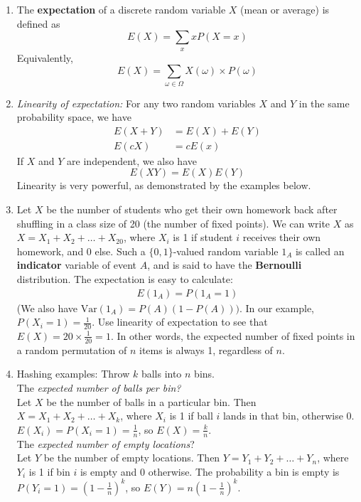 \documentclass[10pt]{article}
\begin{document}
\begin{multicols}{2}
\begin{enumerate}
\begin{enumerate}
            \item The \textbf{expectation} of a discrete random variable $X$ (mean or average) is defined as 
            $$E(X) = \sum_{x} x P(X=x)$$
            Equivalently, 
            $$E(X) = \sum_{\omega \in \Omega} X(\omega) \times P(\omega)$$
            \item \textit{Linearity of expectation:} For any two random variables $X$ and $Y$ in the same probability space, we have 
            \begin{align*}
                E(X+Y) &= E(X)+E(Y) \\
                E(cX) &= cE(x)
            \end{align*}  
            If $X$ and $Y$ are independent, we also have $$E(XY)=E(X)E(Y)$$ 
            Linearity is very powerful, as demonstrated by the examples below.
            \item Let $X$ be the number of students who get their own homework back after shuffling in a class size of 20 (the number of fixed points). We can write $X$ as $X=X_1+X_2+\hdots+X_{20}$, where $X_i$ is 1 if student $i$ receives their own homework, and 0 else. Such a $\{0,1\}$-valued random variable $1_A$ is called an \textbf{indicator} variable of event $A$, and is said to have the \textbf{Bernoulli} distribution. The expectation is easy to calculate:
            \begin{align*}
                E(1_A) = P(1_A = 1)
            \end{align*}
            (We also have $\text{Var}(1_A)=P(A)(1-P(A)))$. In our example, $P(X_i=1) = \frac{1}{20}$. Use linearity of expectation to see that $E(X) = 20 \times \frac{1}{20} = 1$. In other words, the expected number of fixed points in a random permutation of $n$ items is always 1, regardless of $n$. 
            \item Hashing examples: Throw $k$ balls into $n$ bins. \\ The \textit{expected number of balls per bin?} \\ Let $X$ be the number of balls in a particular bin. Then $X=X_1+X_2+\ldots+X_k$, where $X_i$ is 1 if ball $i$ lands in that bin, otherwise 0. $E(X_i)=P(X_i=1)=\frac{1}{n}$, so $E(X)=\frac{k}{n}$. \\ The \textit{expected number of empty locations}? \\ Let $Y$ be the number of empty locations. Then $Y=Y_1+Y_2+\ldots+Y_n$, where $Y_i$ is 1 if bin $i$ is empty and 0 otherwise. The probability a bin is empty is $P(Y_i=1)=(1 - \frac{1}{n})^k$, so $E(Y)=n \left(1 - \frac{1}{n}\right)^k$. \\

\end{enumerate}
\end{enumerate}
\end{multicols}
\end{document}
